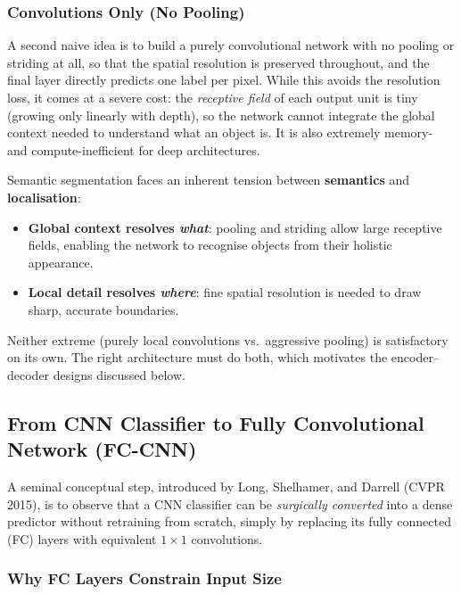 \documentclass[11pt,a4paper]{article}
\begin{document}
\subsubsection{Convolutions Only (No Pooling)}

A second naive idea is to build a purely convolutional network with no pooling or striding at all, so that the spatial resolution is preserved throughout, and the final layer directly predicts one label per pixel. While this avoids the resolution loss, it comes at a severe cost: the \emph{receptive field} of each output unit is tiny (growing only linearly with depth), so the network cannot integrate the global context needed to understand what an object is. It is also extremely memory- and compute-inefficient for deep architectures.

\begin{insightbox}
Semantic segmentation faces an inherent tension between \textbf{semantics} and \textbf{localisation}:
\begin{itemize}
  \item \textbf{Global context resolves \emph{what}}: pooling and striding allow large receptive fields, enabling the network to recognise objects from their holistic appearance.
  \item \textbf{Local detail resolves \emph{where}}: fine spatial resolution is needed to draw sharp, accurate boundaries.
\end{itemize}
Neither extreme (purely local convolutions vs.\ aggressive pooling) is satisfactory on its own. The right architecture must do both, which motivates the encoder--decoder designs discussed below.
\end{insightbox}

\subsection{From CNN Classifier to Fully Convolutional Network (FC-CNN)}
\label{sec:fccnn}

A seminal conceptual step, introduced by Long, Shelhamer, and Darrell (CVPR 2015), is to observe that a CNN classifier can be \emph{surgically converted} into a dense predictor without retraining from scratch, simply by replacing its fully connected (FC) layers with equivalent $1\times 1$ convolutions.

\subsubsection{Why FC Layers Constrain Input Size}
\end{document}
